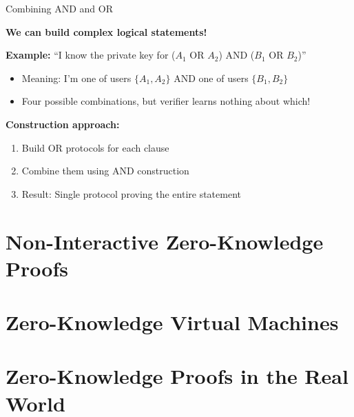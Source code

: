 \documentclass[aspectratio=169, lualatex, handout]{beamer}
\begin{document}
\begin{frame}{Combining AND and OR}
	\begin{center}
		\textbf{We can build complex logical statements!}
	\end{center}
	\vspace{0.5em}
	\textbf{Example:} ``I know the private key for ($A_1$ OR $A_2$) AND ($B_1$ OR $B_2$)''
	\begin{itemize}
		\item Meaning: I'm one of users $\{A_1, A_2\}$ AND one of users $\{B_1, B_2\}$
		\item Four possible combinations, but verifier learns nothing about which!
	\end{itemize}
	\vspace{0.5em}
	\textbf{Construction approach:}
	\begin{enumerate}
		\item Build OR protocols for each clause
		\item Combine them using AND construction
		\item Result: Single protocol proving the entire statement
	\end{enumerate}
\end{frame}

\section{Non-Interactive Zero-Knowledge Proofs}

\section{Zero-Knowledge Virtual Machines}

\section{Zero-Knowledge Proofs in the Real World}

\incompleteslideswarning

\begin{frame}[plain]
	\titlepage
\end{frame}
\end{document}
